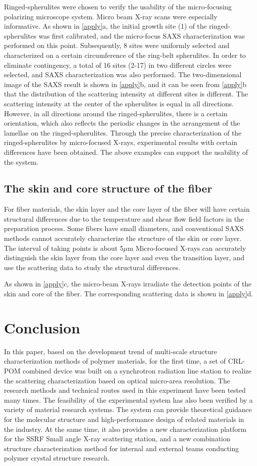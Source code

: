 \documentclass{Head}
\begin{document}
Ringed-spherulites were chosen to verify the usability of the micro-focusing polarizing microscope system.
Micro beam X-ray scans were especially informative. As shown in \autoref{apply}a, the initial growth site (1) of the ringed-spherulites was first calibrated, and the micro-focus SAXS characterization was performed on this point.
Subsequently, 8 sites were uniformly selected and characterized on a certain circumference of the ring-belt spherulites.
In order to eliminate contingency, a total of 16 sites (2-17) in two different circles were selected, and SAXS characterization was also performed.
The two-dimensional image of the SAXS result is shown in \autoref{apply}b, and it can be seen from \autoref{apply}b that the distribution of the scattering intensity at different sites is different. The scattering intensity at the center of the spherulites is equal in all directions.
However, in all directions around the ringed-spherulites, there is a certain orientation, which also reflects the periodic changes in the arrangement of the lamellae on the ringed-spherulites.
Through the precise characterization of the ringed-spherulites by micro-focused X-rays, experimental results with certain differences have been obtained. The above examples can support the usability of the system.
\subsection{The skin and core structure of the fiber}
For fiber materials, the skin layer and the core layer of the fiber will have certain structural differences due to the temperature and shear flow field factors in the preparation process.
Some fibers have small diameters, and conventional SAXS methods cannot accurately characterize the structure of the skin or core layer.
The interval of taking points is about 5$\mu$m
Micro-focused X-rays can accurately distinguish the skin layer from the core layer and even the transition layer, and use the scattering data to study the structural differences.


As shown in \autoref{apply}c, the micro-beam X-rays irradiate the detection points of the skin and core of the fiber. The corresponding scattering data is shown in \autoref{apply}d.
\section{Conclusion}
In this paper, based on the development trend of multi-scale structure characterization methods of polymer materials, for the first time, a set of CRL-POM combined device was built on a synchrotron radiation line station to realize the scattering characterization based on optical micro-area resolution. The research methods and technical routes used in this experiment have been tested many times. The feasibility of the experimental system has also been verified by a variety of material research systems. The system can provide theoretical guidance for the molecular structure and high-performance design of related materials in the industry. At the same time, it also provides a new characterization platform for the SSRF Small angle X-ray scattering station, and a new combination structure characterization method for internal and external teams conducting polymer crystal structure research.

\end{document}
